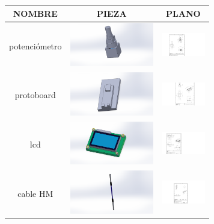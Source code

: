     \begin{table} [H]
          
      \huge
      \tiny 
      \begin{tabular}   {| c |  c |  c | }
      
      \hline
      NOMBRE & PIEZA  & PLANO \\
      \hline 
      potenciómetro  &  \includegraphics[height=19mm]{7/img/piezaaauno.PNG}  & 
       \includegraphics[width=19mm]{7/img/Pieza1.PNG} \\
        \hline
      protoboard &  \includegraphics[height=19mm]{7/img/Piezauno.PNG}  & 
       \includegraphics[width=19mm]{7/img/Pieza2.PNG}  \\
        \hline
        lcd & \includegraphics[height=19mm]{7/img/piezatress.PNG}  & 
       \includegraphics[width=19mm]{7/img/Pieza3.PNG} \\
        \hline
        cable HM & \includegraphics [height=19mm]{7/img/cuatrooo.PNG}  & 
       \includegraphics[width=19mm]{7/img/Pieza4.PNG} \\

\end{tabular}
\end{table}
